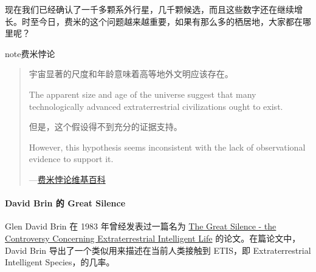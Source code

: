 \documentclass[letterpaper,10pt,english]{sphinxmanual}
\begin{document}
现在我们已经确认了一千多颗系外行星，几千颗候选，而且这些数字还在继续增长。时至今日，费米的这个问题越来越重要，如果有那么多的栖居地，大家都在哪里呢？

\begin{notice}{note}{费米悖论}
\begin{quote}

宇宙显著的尺度和年龄意味着高等地外文明应该存在。

The apparent size and age of the universe suggest that many technologically advanced extraterrestrial civilizations ought to exist.

但是，这个假设得不到充分的证据支持。

However, this hypothesis seems inconsistent with the lack of observational evidence to support it.

\begin{flushright}
---\href{http://zh.wikipedia.org/wiki/\%E8\%B4\%B9\%E7\%B1\%B3\%E6\%82\%96\%E8\%AE\%BA}{费米悖论\textbar{}维基百科}
\end{flushright}
\end{quote}
\end{notice}


\paragraph{David Brin 的 Great Silence}
\label{physics:david-brin-great-silence}\label{physics:index-8}
Glen David Brin 在 1983 年曾经发表过一篇名为 \href{http://www.brin-l.com/downloads/silence.pdf}{The Great Silence - the Controversy Concerning Extraterrestrial Intelligent Life} 的论文。在篇论文中，David Brin 导出了一个类似用来描述在当前人类接触到 ETIS，即 Extraterrestrial Intelligent Species，的几率。
\end{document}
